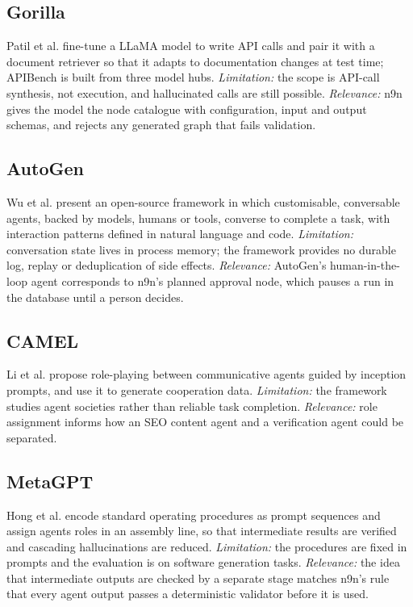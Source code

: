 \documentclass[conference]{IEEEtran}
\begin{document}
\subsection{Gorilla}
Patil et al. \cite{patil2023gorilla} fine-tune a LLaMA model to write API calls and pair it with a document retriever so that it adapts to documentation changes at test time; APIBench is built from three model hubs. \emph{Limitation:} the scope is API-call synthesis, not execution, and hallucinated calls are still possible. \emph{Relevance:} n9n gives the model the node catalogue with configuration, input and output schemas, and rejects any generated graph that fails validation.

\subsection{AutoGen}
Wu et al. \cite{wu2023autogen} present an open-source framework in which customisable, conversable agents, backed by models, humans or tools, converse to complete a task, with interaction patterns defined in natural language and code. \emph{Limitation:} conversation state lives in process memory; the framework provides no durable log, replay or deduplication of side effects. \emph{Relevance:} AutoGen's human-in-the-loop agent corresponds to n9n's planned approval node, which pauses a run in the database until a person decides.

\subsection{CAMEL}
Li et al. \cite{li2023camel} propose role-playing between communicative agents guided by inception prompts, and use it to generate cooperation data. \emph{Limitation:} the framework studies agent societies rather than reliable task completion. \emph{Relevance:} role assignment informs how an SEO content agent and a verification agent could be separated.

\subsection{MetaGPT}
Hong et al. \cite{hong2023metagpt} encode standard operating procedures as prompt sequences and assign agents roles in an assembly line, so that intermediate results are verified and cascading hallucinations are reduced. \emph{Limitation:} the procedures are fixed in prompts and the evaluation is on software generation tasks. \emph{Relevance:} the idea that intermediate outputs are checked by a separate stage matches n9n's rule that every agent output passes a deterministic validator before it is used.
\end{document}
